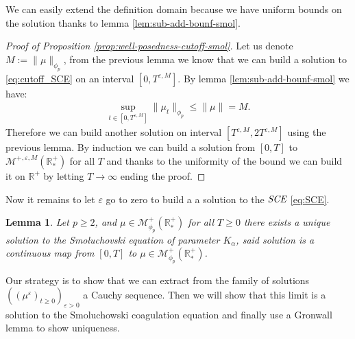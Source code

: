 \documentclass[11pt,a4paper]{article}
\newcommand{\RR}{\mathbb{R}}
\newcommand{\RRP}{\mathbb{R}^+_*}
\newcommand{\MC}{\mathcal{M}}
\newcommand{\SCE}{\emph{SCE}}
\newcommand{\Proc}[1]{\left(#1\right)_{t\geq 0}}
\newtheorem{lemma}[theorem]{Lemma}
\begin{document}
We can easily extend the definition domain because we have uniform bounds on the solution thanks to lemma \ref{lem:sub-add-bounf-smol}.
\begin{proof}[Proof of Proposition \ref{prop:well-posedness-cutoff-smol}]
    Let us denote $M:= \|\mu\|_{\phi_p}$, from the previous lemma we know that we can build a solution to \eqref{eq:cutoff_SCE} on an interval $\left[0,T^{\varepsilon,M}\right]$. By lemma \ref{lem:sub-add-bounf-smol} we have:
    \begin{align*}
        \sup\limits_{t \in \left[0,T^{\varepsilon,M}\right]} \|\mu_t\|_{\phi_p} \leq \|\mu\| = M.
    \end{align*}
    Therefore we can build another solution on interval $\left[T^{\varepsilon,M}, 2T^{\varepsilon,M}\right]$ using the previous lemma. By induction we can build a solution from $[0,T]$ to $\MC^{+,\varepsilon,M}\left(\RRP\right)$ for all $T$ and thanks to the uniformity of the bound we can build it on $\RR^{+}$ by letting $T \to \infty$ ending the proof.
\end{proof}
Now it remains to let $\varepsilon$ go to zero to build a a solution to the $\SCE$ \eqref{eq:SCE}. 
\begin{lemma}\label{lem:well_posedness_smol_eq}
    Let $p \geq 2$, and $\mu \in \MC_{\phi_p}^+ (\RRP)$ for all $T \geq 0$ there exists a unique solution to the Smoluchovski equation of parameter $K_\alpha$, said solution is a continuous map from $[0,T]$ to $\mu \in \MC_{\phi_p}^+ (\RRP)$.
\end{lemma}
Our strategy is to show that we can extract from the family of solutions $\left(\Proc{\mu^\varepsilon}\right)_{\varepsilon > 0}$ a Cauchy sequence. Then we will show that this limit is a solution to the Smoluchowski coagulation equation and finally use a Gronwall lemma to show uniqueness. 
\end{document}
